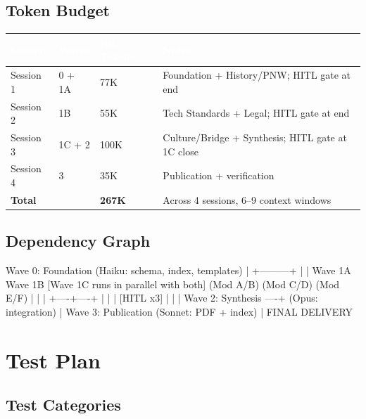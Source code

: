 \documentclass[11pt,letterpaper]{article}
\newcommand{\tableheader}[1]{\textbf{\sffamily\textcolor{white}{#1}}}
\begin{document}
\subsection{Token Budget}

\begin{center}
\begin{tabularx}{\textwidth}{L{4cm}C{2cm}C{2cm}X}
\toprule
{}
\tableheader{Session} & \tableheader{Waves} & \tableheader{Est. Tokens} & \tableheader{Notes} \\
\midrule
Session 1 & 0 + 1A & 77K & Foundation + History/PNW; HITL gate at end \\
Session 2 & 1B & 55K & Tech Standards + Legal; HITL gate at end \\
Session 3 & 1C + 2 & 100K & Culture/Bridge + Synthesis; HITL gate at 1C close \\
Session 4 & 3 & 35K & Publication + verification \\
\midrule
{}
\textbf{Total} & & \textbf{267K} & Across 4 sessions, 6--9 context windows \\
\bottomrule
\end{tabularx}
\end{center}

\subsection{Dependency Graph}

\begin{asciibox}
Wave 0: Foundation
  (Haiku: schema, index, templates)
         |
    +---------+
    |         |
  Wave 1A   Wave 1B   [Wave 1C runs in parallel with both]
  (Mod A/B) (Mod C/D)  (Mod E/F)
    |         |           |
    +----+----+           |
         |                |
    [HITL x3]            |
         |                |
    Wave 2: Synthesis ----+
    (Opus: integration)
         |
    Wave 3: Publication
    (Sonnet: PDF + index)
         |
    FINAL DELIVERY
\end{asciibox}

\section{Test Plan}

\subsection{Test Categories}
\end{document}
